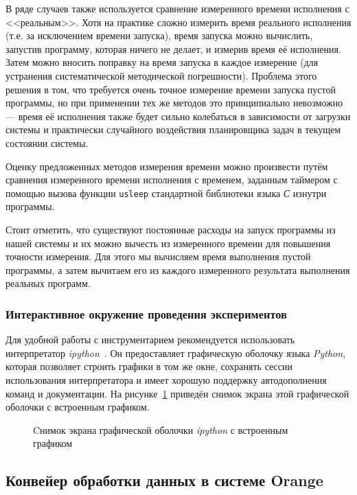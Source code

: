 В ряде случаев также используется сравнение измеренного времени исполнения с <<реальным>>. Хотя на практике сложно измерить время реального исполнения (т.е. за исключением времени запуска), время запуска можно вычислить, запустив программу, которая ничего не делает, и измерив время её исполнения. Затем можно вносить поправку на время запуска в каждое измерение (для устранения систематической методической погрешности). Проблема этого решения в том, что требуется очень точное измерение времени запуска пустой программы, но при применении тех же методов это принципиально невозможно --- время её исполнения также будет сильно колебаться в зависимости от загрузки системы и практически случайного воздействия планировщика задач в текущем состоянии системы.

Оценку предложенных методов измерения времени можно произвести путём сравнения измеренного времени исполнения с временем, заданным таймером с помощью вызова функции \texttt{usleep} стандартной библиотеки языка \textit{С} изнутри программы.

Стоит отметить, что существуют постоянные расходы на запуск программы из нашей системы и их можно вычесть из измеренного времени для повышения точности измерения. Для этого мы вычисляем время выполнения пустой программы, а затем вычитаем его из каждого измеренного результата выполнения реальных программ.


\subsubsection{Интерактивное окружение проведения экспериментов}
Для удобной работы с инструментарием рекомендуется использовать интерпретатор \textit{ipython}~\cite{ipython}. Он предоставляет графическую оболочку языка \textit{Python}, которая позволяет строить графики в том же окне, сохранять сессии использования интерпретатора и имеет хорошую поддержку автодополнения команд и документации. На рисунке~\ref{img:besselj} приведён снимок экрана этой графической оболочки с встроенным графиком.

\begin{figure}[tbp]
    \caption{Cнимок экрана графической оболочки \textit{ipython} с встроенным графиком}
    \label{img:besselj}
\end{figure}

\subsection{Конвейер обработки данных в системе Orange}
\label{orange-pipeline}

